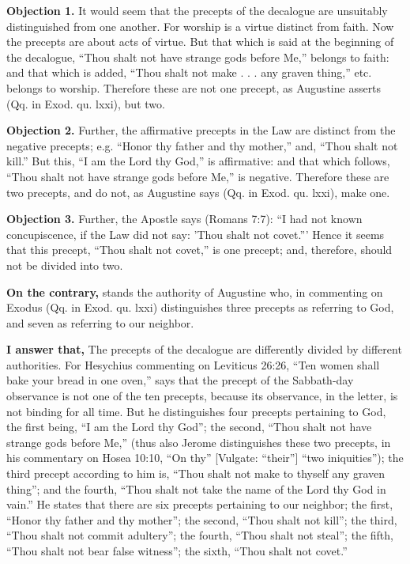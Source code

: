 \textbf{Objection 1.} It would seem that the precepts of the decalogue are unsuitably distinguished from one another. For worship is a virtue distinct from faith. Now the precepts are about acts of virtue. But that which is said at the beginning of the decalogue, ``Thou shalt not have strange gods before Me,'' belongs to faith: and that which is added, ``Thou shalt not make . . . any graven thing,'' etc. belongs to worship. Therefore these are not one precept, as Augustine asserts (Qq. in Exod. qu. lxxi), but two.

\textbf{Objection 2.} Further, the affirmative precepts in the Law are distinct from the negative precepts; e.g. ``Honor thy father and thy mother,'' and, ``Thou shalt not kill.'' But this, ``I am the Lord thy God,'' is affirmative: and that which follows, ``Thou shalt not have strange gods before Me,'' is negative. Therefore these are two precepts, and do not, as Augustine says (Qq. in Exod. qu. lxxi), make one.

\textbf{Objection 3.} Further, the Apostle says (Romans 7:7): ``I had not known concupiscence, if the Law did not say: 'Thou shalt not covet.''' Hence it seems that this precept, ``Thou shalt not covet,'' is one precept; and, therefore, should not be divided into two.

\textbf{On the contrary,} stands the authority of Augustine who, in commenting on Exodus (Qq. in Exod. qu. lxxi) distinguishes three precepts as referring to God, and seven as referring to our neighbor.

\textbf{I answer that,} The precepts of the decalogue are differently divided by different authorities. For Hesychius commenting on Leviticus 26:26, ``Ten women shall bake your bread in one oven,'' says that the precept of the Sabbath-day observance is not one of the ten precepts, because its observance, in the letter, is not binding for all time. But he distinguishes four precepts pertaining to God, the first being, ``I am the Lord thy God''; the second, ``Thou shalt not have strange gods before Me,'' (thus also Jerome distinguishes these two precepts, in his commentary on Hosea 10:10, ``On thy'' [Vulgate: ``their''] ``two iniquities''); the third precept according to him is, ``Thou shalt not make to thyself any graven thing''; and the fourth, ``Thou shalt not take the name of the Lord thy God in vain.'' He states that there are six precepts pertaining to our neighbor; the first, ``Honor thy father and thy mother''; the second, ``Thou shalt not kill''; the third, ``Thou shalt not commit adultery''; the fourth, ``Thou shalt not steal''; the fifth, ``Thou shalt not bear false witness''; the sixth, ``Thou shalt not covet.''

